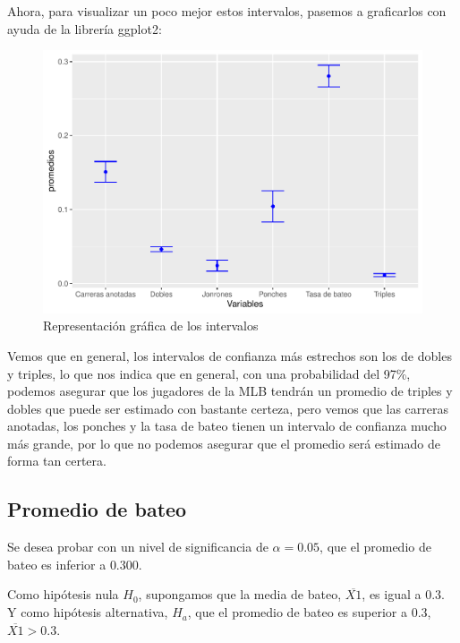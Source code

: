 \documentclass{staprojteamusb}
\begin{document}
 Ahora, para visualizar un poco mejor estos intervalos, pasemos a graficarlos con ayuda de la librería ggplot2:

 \begin{figure}
 \centering
 \includegraphics{C03322-InformeFinal-Cordero-Gavazut-Riera_files/figure-latex/unnamed-chunk-7-1.pdf}
 \caption{\label{fig:unnamed-chunk-7}Representación gráfica de los intervalos}
 \end{figure}

 Vemos que en general, los intervalos de confianza más estrechos son los de dobles y triples, lo que nos indica que en general, con una probabilidad del 97\%, podemos asegurar que los jugadores de la MLB tendrán un promedio de triples y dobles que puede ser estimado con bastante certeza, pero vemos que las carreras anotadas, los ponches y la tasa de bateo tienen un intervalo de confianza mucho más grande, por lo que no podemos asegurar que el promedio será estimado de forma tan certera.

 \hypertarget{promedio-de-bateo}{%
 \subsection{Promedio de bateo}\label{promedio-de-bateo}}

 Se desea probar con un nivel de significancia de \(\alpha=0.05\), que el promedio de bateo es inferior a \(0.300\).

 Como hipótesis nula \(H_{0}\), supongamos que la media de bateo, \(\overline{X1}\), es igual a \(0.3\). Y como hipótesis alternativa, \(H_{a}\), que el promedio de bateo es superior a \(0.3\), \(\overline{X1}>0.3\).
\end{document}
